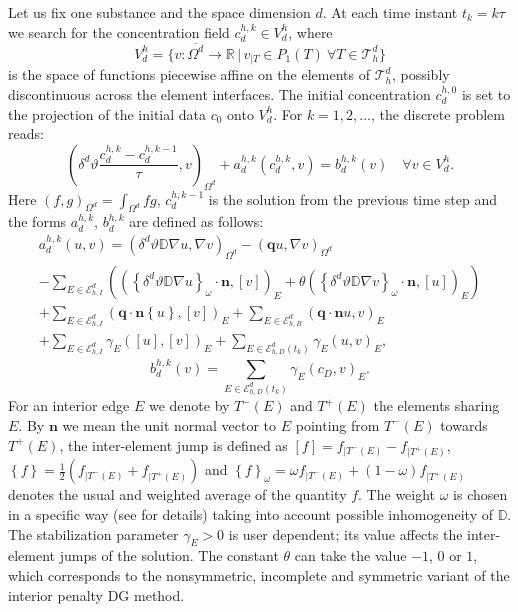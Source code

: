 \documentclass[a4paper]{article}
\def\avg#1{\left\{#1\right\}}
\def\D{{\tn D}}
\def\Ehb{\mathcal E_{h,B}}  %
\def\Ehdir{\mathcal E_{h,D}}         %
\def\Ehint{\mathcal E_{h,I}}       %
\def\jmp#1{[#1]}
\def\n{\vc n}
\def\vc#1{\mathbf{\boldsymbol{#1}}}     %
\def\R{\mathbb R}
\def\sc#1#2{\left(#1,#2\right)}
\def\Th{\mathcal T_h}       %
\def\th{\vartheta}
\def\tn#1{{\mathbb{#1}}}    %
\def\wavg#1{\avg{#1}_\omega}
\def\where{\,|\,}
\begin{document}
Let us fix one substance and the space dimension $d$.
At each time instant $t_k=k\tau$ we search for the concentration field $c_d^{h,k}\in V_d^h$, where
$$ V_d^h = \{v:\overline{\Omega^d}\to\R\where v_{|T}\in P_1(T)~\forall T\in\Th^d\} $$
is the space of functions piecewise affine on the elements of $\Th^d$, possibly discontinuous across the element interfaces.
The initial concentration $c^{h,0}_d$ is set to the projection of the initial data $c_0$ onto $V_d^h$.
For $k=1,2,\ldots$, the discrete problem reads:
\begin{equation*}
\sc{\delta^d\th\frac{c_d^{h,k}-c^{h,k-1}_d}\tau}{v}_{\Omega^d} + a^{h,k}_d(c^{h,k}_d,v) = b^{h,k}_d(v) \quad \forall v\in V^h_d.
\end{equation*}
Here $\sc{f}{g}_{\Omega^d}=\int_{\Omega^d} f g$, $c^{h,k-1}_d$ is the solution from the previous time step and the forms $a^{h,k}_d$, $b^{h,k}_d$ are defined as follows:
\begin{multline*}
a^{h,k}_d(u,v) = \sc{\delta^d\th\D\nabla u}{\nabla v}_{\Omega^d}
- \sc{\vc q u}{\nabla v}_{\Omega^d}\\
- \sum_{E\in\Ehint^d}\left(\sc{\wavg{\delta^d\th\D\nabla u}\cdot\n}{\jmp{v}}_E + \theta\sc{\wavg{\delta^d\th\D\nabla v}\cdot\n}{\jmp{u}}_E\right)\\
+ \sum_{E\in\Ehint^d}\sc{\vc q\cdot\n\avg{u}}{\jmp{v}}_E
+ \sum_{E\in\Ehb^d}\sc{\vc q\cdot\n u}{v}_E \\
+ \sum_{E\in\Ehint^d}\gamma_E\sc{\jmp{u}}{\jmp{v}}_E
+ \sum_{E\in\Ehdir^d(t_k)}\gamma_E\sc{u}{v}_E,
\end{multline*}
% 
\begin{equation*}
b^{h,k}_d(v) = \sum_{E\in\Ehdir^d(t_k)}\gamma_E\sc{c_D}{v}_E.
\end{equation*}
For an interior edge $E$ we denote by $T^-(E)$ and $T^+(E)$ the elements sharing $E$.
By $\n$ we mean the unit normal vector to $E$ pointing from $T^-(E)$ towards $T^+(E)$, the inter-element jump is defined as $\jmp{f}=f_{|T^-(E)}-f_{|T^+(E)}$, $\avg{f}=\frac12(f_{|T^-(E)} + f_{|T^+(E)})$ and $\wavg{f}=\omega f_{|T^-(E)} + (1-\omega) f_{|T^+(E)}$ denotes the usual and weighted average of the quantity $f$.
The weight $\omega$ is chosen in a specific way (see \cite{ern_stephansen_zunino} for details) taking into account possible inhomogeneity of $\D$.
The stabilization parameter $\gamma_E>0$ is user dependent; its value affects the inter-element jumps of the solution.
The constant $\theta$ can take the value $-1$, $0$ or $1$, which corresponds to the nonsymmetric, incomplete and symmetric variant of the interior penalty DG method.
\end{document}
